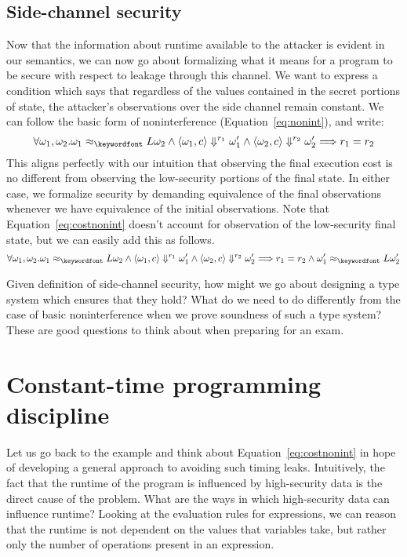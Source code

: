 \documentclass[11pt,twoside]{scrartcl}
\begin{document}
\subsection{Side-channel security}

Now that the information about runtime available to the attacker is evident in our semantics, we can now go about formalizing what it means for a program to be secure with respect to leakage through this channel. We want to express a condition which says that regardless of the values contained in the secret portions of state, the attacker's observations over the side channel remain constant. We can follow the basic form of noninterference (Equation~\ref{eq:nonint}), and write:
\begin{equation}
\label{eq:costnonint}
\forall \omega_1,\omega_2 . \omega_1 \approx_\lowt \omega_2 \land \langle \omega_1, c\rangle \Downarrow^{r_1} \omega_1' \land \langle\omega_2, c\rangle\Downarrow^{r_2}\omega_2' \Longrightarrow r_1 = r_2
\end{equation}
This aligns perfectly with our intuition that observing the final execution cost is no different from observing the low-security portions of the final state. In either case, we formalize security by demanding equivalence of the final observations whenever we have equivalence of the initial observations. Note that Equation~\ref{eq:costnonint} doesn't account for observation of the low-security final state, but we can easily add this as follows.
\begin{equation}
\label{eq:costfull}
\forall \omega_1,\omega_2 . \omega_1 \approx_\lowt \omega_2 \land \langle \omega_1, c\rangle \Downarrow^{r_1} \omega_1' \land \langle\omega_2, c\rangle\Downarrow^{r_2}\omega_2' \Longrightarrow r_1 = r_2 \land \omega_1' \approx_\lowt \omega_2'
\end{equation}

Given definition of side-channel security, how might we go about designing a type system which ensures that they hold? What do we need to do differently from the case of basic noninterference when we prove soundness of such a type system? These are good questions to think about when preparing for an exam.

\section{Constant-time programming discipline}

Let us go back to the  example and think about Equation~\ref{eq:costnonint} in hope of developing a general approach to avoiding such timing leaks. Intuitively, the fact that the runtime of the program is influenced by high-security data is the direct cause of the problem. What are the ways in which high-security data can influence runtime? Looking at the evaluation rules for expressions, we can reason that the runtime is not dependent on the values that variables take, but rather only the number of operations present in an expression.
\end{document}
